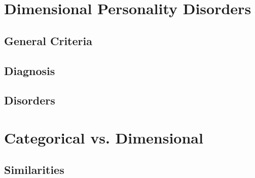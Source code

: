 \documentclass[xcolor=x11names,compress]{beamer}\usepackage[]{graphicx}\usepackage[]{color}
\renewcommand{\(}{\begin{columns}}
\renewcommand{\)}{\end{columns}}
\newcommand{\<}[1]{\begin{column}{#1}}
\renewcommand{\>}{\end{column}}
\begin{document}






\section{Dimensional Personality Disorders}
\subsection{General Criteria}


\subsection{Diagnosis}


\subsection{Disorders}


\section{Categorical vs. Dimensional}
\subsection{Similarities}
\end{document}
